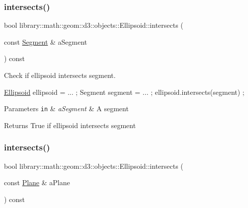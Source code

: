 \subsubsection{\texorpdfstring{intersects()}{intersects()}\hspace{0.1cm}{\footnotesize\ttfamily [5/9]}}
{\footnotesize\ttfamily bool library\+::math\+::geom\+::d3\+::objects\+::\+Ellipsoid\+::intersects (\begin{DoxyParamCaption}\item[{const \hyperlink{classlibrary_1_1math_1_1geom_1_1d3_1_1objects_1_1_segment}{Segment} \&}]{a\+Segment }\end{DoxyParamCaption}) const}



Check if ellipsoid intersects segment. 


\begin{DoxyCode}
\hyperlink{classlibrary_1_1math_1_1geom_1_1d3_1_1objects_1_1_ellipsoid_aae81fe0edc7f0e8d4590ea89ae73cb14}{Ellipsoid} ellipsoid = ... ;
Segment segment = ... ;
ellipsoid.intersects(segment) ;
\end{DoxyCode}



\begin{DoxyParams}[1]{Parameters}
\mbox{\tt in}  & {\em a\+Segment} & A segment \\
\hline
\end{DoxyParams}
\begin{DoxyReturn}{Returns}
True if ellipsoid intersects segment 
\end{DoxyReturn}
\mbox{\label{classlibrary_1_1math_1_1geom_1_1d3_1_1objects_1_1_ellipsoid_ada79a3cf3bf68843a8313eb914c21a95}} 
\subsubsection{\texorpdfstring{intersects()}{intersects()}\hspace{0.1cm}{\footnotesize\ttfamily [6/9]}}
{\footnotesize\ttfamily bool library\+::math\+::geom\+::d3\+::objects\+::\+Ellipsoid\+::intersects (\begin{DoxyParamCaption}\item[{const \hyperlink{classlibrary_1_1math_1_1geom_1_1d3_1_1objects_1_1_plane}{Plane} \&}]{a\+Plane }\end{DoxyParamCaption}) const}



